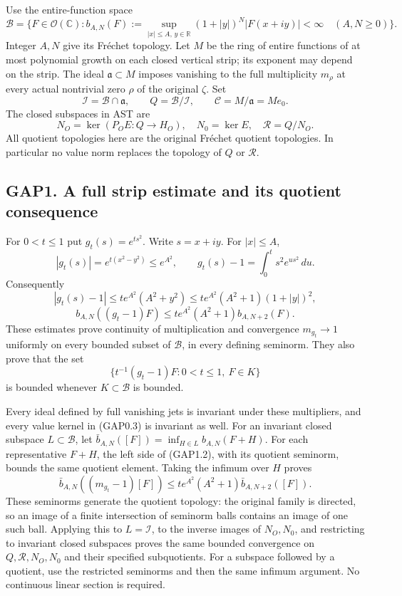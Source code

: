 Use the entire-function space \[
\mathcal B=\{F\in\mathcal O(\mathbb C):
b_{A,N}(F):=\sup_{|x|\le A,\,y\in\mathbb R}
(1+|y|)^N|F(x+iy)|<\infty\quad(A,N\ge0)\}.
\tag{GAP0.1}
\] Integer \(A,N\) give its Fréchet topology. Let \(M\) be the ring of
entire functions of at most polynomial growth on each closed vertical
strip; its exponent may depend on the strip. The ideal
\(\mathfrak a\subset M\) imposes vanishing to the full multiplicity
\(m_\rho\) at every actual nontrivial zero \(\rho\) of the original
\(\zeta\). Set \[
\mathcal I=\mathcal B\cap\mathfrak a,\qquad
Q=\mathcal B/\mathcal I,\qquad
\mathscr C=M/\mathfrak a=M e_0.
\tag{GAP0.2}
\] The closed subspaces in AST are \[
N_O=\ker(P_OE:Q\to H_O),\quad N_0=\ker E,
\quad\mathcal R=Q/N_O.
\tag{GAP0.3}
\] All quotient topologies here are the original Fréchet quotient
topologies. In particular no value norm replaces the topology of \(Q\)
or \(\mathcal R\).

\subsection{GAP1. A full strip estimate and its quotient
consequence}\label{gap1.-a-full-strip-estimate-and-its-quotient-consequence}

For \(0<t\le1\) put \(g_t(s)=e^{ts^2}\). Write \(s=x+iy\). For
\(|x|\le A\), \[
|g_t(s)|=e^{t(x^2-y^2)}\le e^{A^2},\qquad
g_t(s)-1=\int_0^t s^2e^{us^2}\,du.
\tag{GAP1.1}
\] Consequently \[
|g_t(s)-1|\le t e^{A^2}(A^2+y^2)
\le t e^{A^2}(A^2+1)(1+|y|)^2,
\] \[
\boxed{b_{A,N}((g_t-1)F)
\le t e^{A^2}(A^2+1)b_{A,N+2}(F).}
\tag{GAP1.2}
\] These estimates prove continuity of multiplication and convergence
\(m_{g_t}\to1\) uniformly on every bounded subset of \(\mathcal B\), in
every defining seminorm. They also prove that the set \[
\{t^{-1}(g_t-1)F:0<t\le1,\ F\in K\}
\tag{GAP1.3}
\] is bounded whenever \(K\subset\mathcal B\) is bounded.

Every ideal defined by full vanishing jets is invariant under these
multipliers, and every value kernel in (GAP0.3) is invariant as well.
For an invariant closed subspace \(L\subset\mathcal B\), let
\(\bar b_{A,N}([F])=\inf_{H\in L}b_{A,N}(F+H)\). For each representative
\(F+H\), the left side of (GAP1.2), with its quotient seminorm, bounds
the same quotient element. Taking the infimum over \(H\) proves \[
\bar b_{A,N}((m_{g_t}-1)[F])
\le t e^{A^2}(A^2+1)\bar b_{A,N+2}([F]).
\tag{GAP1.4}
\] These seminorms generate the quotient topology: the original family
is directed, so an image of a finite intersection of seminorm balls
contains an image of one such ball. Applying this to \(L=\mathcal I\),
to the inverse images of \(N_O,N_0\), and restricting to invariant
closed subspaces proves the same bounded convergence on
\(Q,\mathcal R,N_O,N_0\) and their specified subquotients. For a
subspace followed by a quotient, use the restricted seminorms and then
the same infimum argument. No continuous linear section is required.

